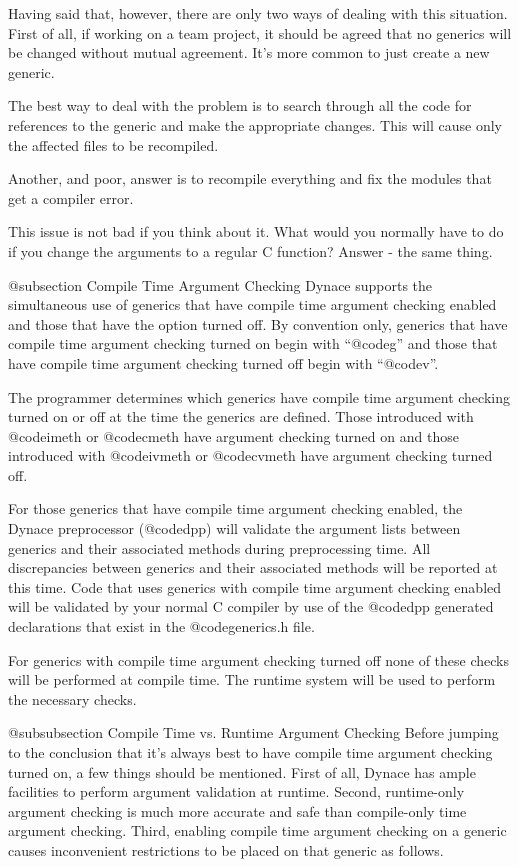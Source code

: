 Having said that, however, there are only two ways of dealing with
this situation.  First of all, if working on a team project, it should
be agreed that no generics will be changed without mutual agreement.
It's more common to just create a new generic.

The best way to deal with the problem is to search through all the
code for references to the generic and make the appropriate changes.
This will cause only the affected files to be recompiled.

Another, and poor, answer is to recompile everything and fix the modules
that get a compiler error.

This issue is not bad if you think about it.  What would you normally
have to do if you change the arguments to a regular C function?  Answer -
the same thing.

@subsection Compile Time Argument Checking
Dynace supports the simultaneous use of generics that have compile
time argument checking enabled and those that have the option
turned off.  By convention only, generics that have compile time
argument checking turned on begin with ``@code{g}'' and those that
have compile time argument checking turned off begin with ``@code{v}''. 

The programmer determines which generics have compile time argument checking
turned on or off at the time the generics are defined.  Those introduced
with @code{imeth} or @code{cmeth} have argument checking turned on and
those introduced with @code{ivmeth} or @code{cvmeth} have argument checking
turned off.

For those generics that have compile time argument checking enabled,
the Dynace preprocessor (@code{dpp}) will validate the argument lists
between generics and their associated methods during preprocessing time.
All discrepancies between generics and their associated methods will be
reported at this time.  Code that uses generics with compile time
argument checking enabled will be validated by your normal C compiler by
use of the @code{dpp} generated declarations that exist in the
@code{generics.h} file.

For generics with compile time argument checking turned off none of
these checks will be performed at compile time.  The runtime system
will be used to perform the necessary checks.

@subsubsection Compile Time vs. Runtime Argument Checking
Before jumping to the conclusion that it's always best to have compile
time argument checking turned on, a few things should be mentioned.
First of all, Dynace has ample facilities to perform argument validation
at runtime.  Second, runtime-only argument checking is much more accurate
and safe than compile-only time argument checking.  Third, enabling
compile time argument checking on a generic causes inconvenient
restrictions to be placed on that generic as follows.

